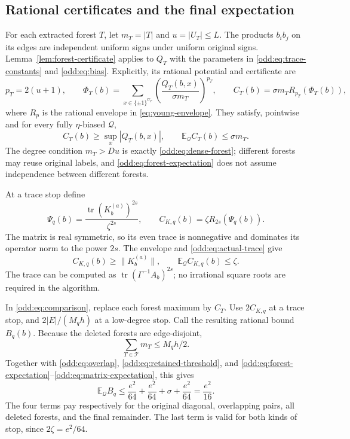 \documentclass[letterpaper,11pt]{article}
\theoremstyle{definition}
\newcommand{\E}{\mathbb E}
\begin{document}
\subsection{Rational certificates and the final expectation}

For each extracted forest $T$, let $m_T=|T|$ and $u=|U_T|\leq L$.
The products $b_ib_j$ on its edges are independent uniform signs under
uniform original signs.  Lemma~\ref{lem:forest-certificate} applies to
$Q_T$ with the parameters in \eqref{odd:eq:trace-constants} and
\eqref{odd:eq:bias}.  Explicitly, its rational potential and certificate
are
\begin{equation}\label{odd:eq:forest-certificate}
 p_T=2(u+1),\qquad
 \Phi_T(b)=\sum_{x\in\{\pm1\}^{U_T}}
          \left(\frac{Q_T(b,x)}{\sigma m_T}\right)^{p_T},\qquad
 C_T(b)=\sigma m_T R_{p_T}(\Phi_T(b)),
\end{equation}
where $R_p$ is the rational envelope in \eqref{eq:young-envelope}.
They satisfy, pointwise and for every fully $\eta$-biased $\mathcal Q$,
\begin{equation}\label{odd:eq:forest-expectation}
 C_T(b)\geq\sup_x|Q_T(b,x)|,\qquad
 \E_{\mathcal Q}C_T(b)\leq\sigma m_T.
\end{equation}
The degree condition $m_T>Du$ is exactly
\eqref{odd:eq:dense-forest}; different forests may reuse original
labels, and \eqref{odd:eq:forest-expectation} does not assume independence
between different forests.

At a trace stop define
\begin{equation}\label{odd:eq:matrix-certificate}
 \Psi_q(b)=\frac{\operatorname{tr}(K_b^{(a)})^{2s}}{\zeta^{2s}},
 \qquad C_{K,q}(b)=\zeta R_{2s}(\Psi_q(b)).
\end{equation}
The matrix is real symmetric, so its even trace is nonnegative and
dominates its operator norm to the power $2s$.  The envelope and
\eqref{odd:eq:actual-trace} give
\begin{equation}\label{odd:eq:matrix-expectation}
 C_{K,q}(b)\geq\|K_b^{(a)}\|,\qquad
 \E_{\mathcal Q}C_{K,q}(b)\leq\zeta.
\end{equation}
The trace can be computed as
$\operatorname{tr}(\Gamma^{-1}A_b)^{2s}$; no irrational square roots
are required in the algorithm.

In \eqref{odd:eq:comparison}, replace each forest maximum by $C_T$.
Use $2C_{K,q}$ at a trace stop, and $2|E|/(M_qh)$ at a low-degree stop.
Call the resulting rational bound $B_q(b)$.  Because the deleted forests
are edge-disjoint,
\[
 \sum_{T\in\mathcal T}m_T\leq M_qh/2.
\]
Together with \eqref{odd:eq:overlap},
\eqref{odd:eq:retained-threshold}, and
\eqref{odd:eq:forest-expectation}--\eqref{odd:eq:matrix-expectation},
this gives
\begin{equation}\label{odd:eq:squared-budget}
 \E_{\mathcal Q} B_q
 \leq\frac{e^2}{64}+\frac{e^2}{64}+\sigma+
                      \frac{e^2}{64}
 =\frac{e^2}{16}.
\end{equation}
The four terms pay respectively for the original diagonal, overlapping
pairs, all deleted forests, and the final remainder.  The last term is
valid for both kinds of stop, since $2\zeta=e^2/64$.
\end{document}
